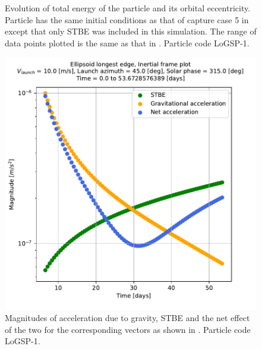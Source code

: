 \documentclass[print]{tudelft-report}
\begin{document}
\begin{appendices}
\begin{figure}[htb]
    \caption{Evolution of total energy of the particle and its orbital eccentricity. Particle has the same initial conditions as that of capture case 5 in  except that only \gls{STBE} was included in this simulation. The range of data points plotted is the same as that in . Particle code LoGSP-1.}
    \label{fig:LoGSP_1_capture_case_5_eccentricity_energy_noSRP}
    \end{figure}
    \FloatBarrier
    \begin{figure}[b]
    \centering
    \captionsetup{justification=centering}
    \includegraphics[width=\linewidth, height=0.5\textheight, keepaspectratio=true]{Results/Images/longest_edge_perturbations/3.2Density_1cmSize/10ms_45Azimuth_315SolarPhase/noSRP_acceleration_magnitudes.pdf}
    \caption{Magnitudes of acceleration due to gravity, \gls{STBE} and the net effect of the two for the corresponding vectors as shown in . Particle code LoGSP-1.}
    \label{fig:LoGSP_1_capture_case_5_2d_acceleration_magnitudes_noSRP}
    \end{figure}
    \FloatBarrier
    \begin{figure}[htb]
    \centering
    \captionsetup{justification=centering}

\end{figure}
\end{appendices}
\end{document}
